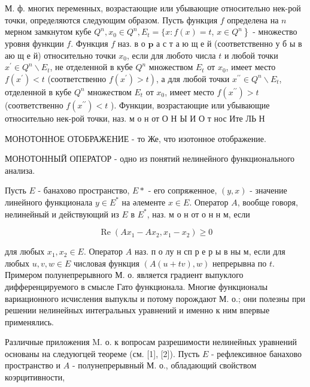 \documentclass[10pt]{article}
\begin{document}
М. ф. многих переменных, возрастающие или убывающие относительно нек-рой точки, определяются следующим образом. Пусть функция $f$ определена на $n$ мерном замкнутом кубе $Q^{n}, x_{0} \in Q^{n}, E_{t}=\{x: f(x)=t$, $\left.x \in Q^{n}\right\}$ - множество уровня функции $f$. Функция $f$ наз. в о $\mathbf{p}$ а с т а ю щ е й (соответственно у б ы в аю щ е й) относительно точки $x_{0}$, если для любото числа $t$ и любой точки $x^{\prime} \in Q^{n} \backslash E_{t}$, не отделенной в кубе $Q^{n}$ множеством $E_{t}$ от $x_{0}$, имеет место $f\left(x^{\prime}\right)<t$ (соответственно $\left.f\left(x^{\prime}\right)>t\right)$, а для любой точки $x^{\prime \prime} \in Q^{n} \backslash E_{t}$, отделенной в кубе $Q^{n}$ множеством $E_{t}$ от $x_{0}$, имеет место $f\left(x^{\prime \prime}\right)>t$ (соответственно $f\left(x^{\prime \prime}\right)<t$ ). Функции, возрастающие или убывающие относительно нек-рой точки, наз. м о н от О Н Ы И О т нос Ите ЛЬ Н



МОНОТОННОЕ ОТОБРАЖЕНИЕ - то Же, что изотонное отображение.



МОНОТОННЫЙ ОПЕРАТОР - одно из понятий нелинейного функционального анализа.



Пусть $E$ - банахово пространство, $E *$ - его сопряженное, $(y, x)$ - значение линейного функционала $y \in E^{*}$ на әлементе $x \in E$. Оператор $A$, вообще говоря, нелинейный и действующий из $E$ в $E^{*}$, наз. м о н от о н н м, если



\[

\operatorname{Re}\left(A x_{1}-A x_{2}, x_{1}-x_{2}\right) \geqslant 0

\]



для любых $x_{1}, x_{2} \in E$. Оператор $A$ наз. п о лу н сп р е р ы в ны м, если для любых $u, v, w \in E$ числовая функция $(A(u+t v), w)$ непрерывна по $t$. Примером полунепрерывного М. о. является градиент выпуклого дифференцируемого в смысле Гато функционала. Многие функционалы вариационного исчисления выпуклы и потому порождают М. о.; они полезны при решении нелинейных интегральных уравнений и именно к ним впервые применялись.



Различные приложения M. о. к вопросам разрешимости нелинейных уравнений основаны на следуюгцей теореме (см. [1], [2]). Пусть $E$ - рефлексивное банахово пространство и $A$ - полунепрерывный М. о., обладающий свойством коэрцитивности,
\end{document}
